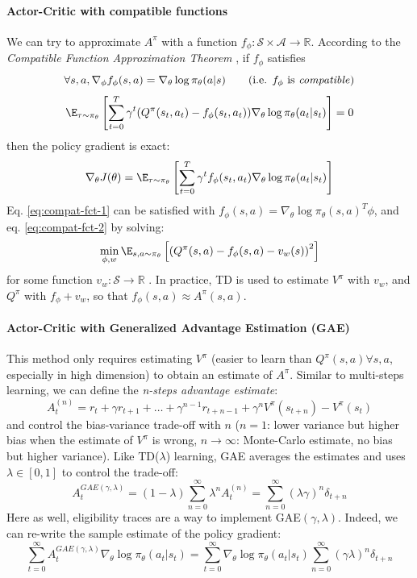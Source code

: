 \paragraph{Actor-Critic with compatible functions}
We can try to approximate $A^\pi$ with a function $f_\phi: \mathcal{S} \times \mathcal{A} \rightarrow \mathbb{R}$. According to the \emph{Compatible Function Approximation Theorem} \cite{sutton2000policy} \demo, if $f_\phi$ satisfies
\begin{equation}
    \forall s, a, \nabla_\phi f_\phi(s,a) = \nabla_\theta \log \pi_\theta(a|s)
    \qquad \text{(i.e. $f_\phi$ is \emph{compatible})}
\label{eq:compat-fct-1}
\end{equation}
\begin{equation}
    \E_{\tau \sim \pi_\theta} \left[ \sum_{t=0}^T \gamma^t (Q^\pi(s_t,a_t) - f_\phi(s_t,a_t)) \nabla_\theta \log \pi_\theta(a_t|s_t)\right] = 0
\label{eq:compat-fct-2}
\end{equation}
then the policy gradient is exact:
\[
    \nabla_\theta J(\theta) 
    = \E_{\tau \sim \pi_\theta} \left[\sum_{t=0}^T \gamma^t f_\phi(s_t,a_t) \nabla_\theta \log \pi_\theta(a_t | s_t) \right]
\]
Eq. \ref{eq:compat-fct-1} can be satisfied with $f_\phi(s,a) = \nabla_\theta \log \pi_\theta(s,a)^T \phi$, and eq. \ref{eq:compat-fct-2} by solving:
\[
    \min_{\phi, w} \E_{s, a \sim \pi_\theta}\left[
    \left(Q^\pi(s,a) - f_\phi(s,a) - v_w(s)\right)^2
    \right]
\]
for some function $v_w:\mathcal{S} \rightarrow \mathbb{R}$ \demo. In practice, TD is used to estimate $V^\pi$ with $v_w$, and $Q^\pi$ with $f_\phi + v_w$, so that $f_\phi(s,a) \approx A^\pi(s,a)$.

\paragraph{Actor-Critic with Generalized Advantage Estimation (GAE) \cite{schulman2015high}}
This method only requires estimating $V^\pi$ (easier to learn than $Q^\pi(s,a) \forall s,a$, especially in high dimension) to obtain an estimate of $A^\pi$.
Similar to multi-steps learning, we can define the \emph{n-steps advantage estimate}:
\begin{equation}
    A_t^{(n)} = r_t + \gamma r_{t+1} + \dots + \gamma^{n-1} r_{t+n-1} + \gamma^n V^\pi(s_{t+n}) - V^\pi(s_t)
\label{eq:n-steps-advantage}
\end{equation}
and control the bias-variance trade-off with $n$ ($n=1$: lower variance but higher bias when the estimate of $V^\pi$ is wrong, $n\rightarrow \infty$: Monte-Carlo estimate, no bias but higher variance). Like TD($\lambda$) learning, GAE averages the estimates and uses $\lambda \in [0,1]$ to control the trade-off:
\[
    A_t^{GAE(\gamma,\lambda)} = (1-\lambda) \sum_{n=0}^\infty \lambda^n A_t^{(n)} = \sum_{n=0}^\infty (\lambda \gamma)^n \delta_{t+n}
\]
Here as well, eligibility traces are a way to implement GAE$(\gamma,\lambda)$. Indeed, we can re-write the sample estimate of the policy gradient:
\[
    \sum_{t=0}^\infty A_t^{GAE(\gamma,\lambda)} \nabla_\theta \log \pi_\theta(a_t | s_t)
    = \sum_{t=0}^\infty \nabla_\theta \log \pi_\theta(a_t | s_t) \sum_{n=0}^\infty (\gamma \lambda)^n \delta_{t+n}
\]

